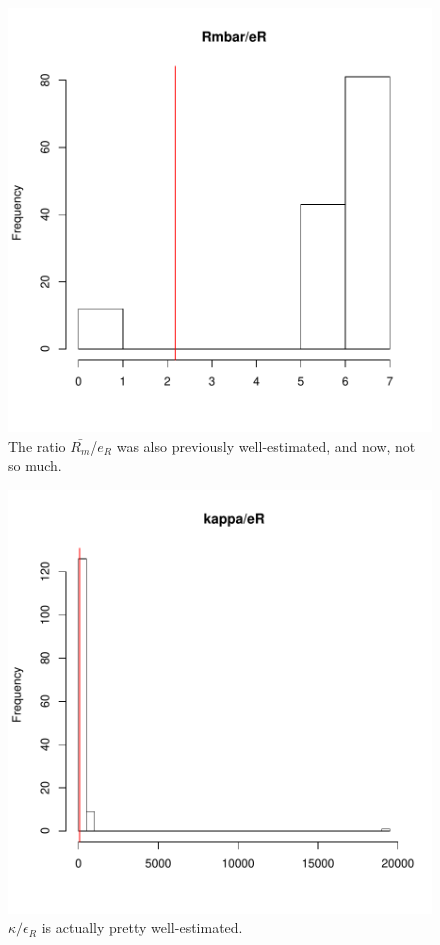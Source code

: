 \documentclass[12pt,reqno,final]{amsart}
\theoremstyle{plain}
\numberwithin{equation}{part}
\begin{document}
\begin{figure}
\includegraphics{Solving_the_problem_of_parameter_covariation_3-006}
\caption{The ratio $\bar{R_m}$/$e_R$ was also previously well-estimated, and
now, not so much.}
\end{figure}


\begin{figure}
\includegraphics{Solving_the_problem_of_parameter_covariation_3-007}
\caption{$\kappa/\epsilon_R$ is actually pretty well-estimated.}
\end{figure}
\end{document}

